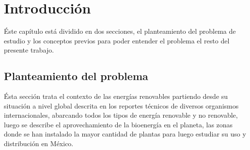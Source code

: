 \makeatletter
\let\savedchap\@makechapterhead
\def\@makechapterhead{\vspace*{-3cm}\savedchap}
\chapter{Introducción}
\let\@makechapterhead\savedchap
\makeatletter

%
Éste capítulo está dividido en dos secciones, el planteamiento del problema de estudio y los conceptos previos para poder entender el problema el resto del presente trabajo.


\vspace{-24pt}
\section{Planteamiento del problema}

Ésta sección trata el contexto de las energías renovables partiendo desde su situación a nivel global descrita en los reportes técnicos de diversos organismos internacionales, abarcando todos los tipos de energía renovable y no renovable, luego se describe el aprovechamiento de la bioenergía en el planeta, las zonas donde se han instalado la mayor cantidad de plantas  para luego estudiar su uso y distribución en México.

